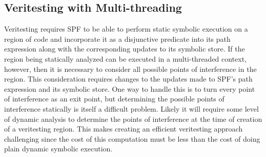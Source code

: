 \subsection{Veritesting with Multi-threading}
Veritesting requires SPF to be able to perform static symbolic execution on a region of code and incorporate it as a disjunctive predicate into its path expression along with the corresponding updates to its symbolic store.
%
If the region being statically analyzed can be executed in a multi-threaded context, however, then it is necessary to consider all possible points of interference in the region.
%
This consideration requires changes to the updates made to SPF\rq s path expression and its symbolic store.
%
One way to handle this is to turn every point of interference as an exit point, but determining the possible points of interference statically is itself a difficult problem.  Likely it will require some level of dynamic analysis to determine the points of interference at the time of creation of a veritesting region.
%
%
This makes creating an efficient veritesting approach challenging since the cost of this computation must be less than the cost of doing plain dynamic symbolic execution.
















%
